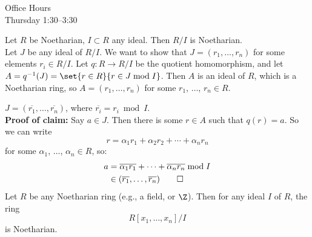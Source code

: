 Office Hours \\
Thursday 1:30--3:30

\thm Let $R$ be Noetharian, $I\subset R$ any ideal.  Then $R/I$ is Noetharian. \\
\pf Let $J$ be any ideal of $R/I$.  We want to show that $J=(r_1,\dotsc,r_n)$ for some elements $r_i\in R/I$.  Let $q\colon R\to R/I$ be the quotient homomorphism, and let $A=q^{-1}(J)=\set{r\in R}{r\in J\bmod I}$.  Then $A$ is an ideal of $R$, which is a Noetharian ring, so $A=(r_1,\dotsc,r_n)$ for some $r_1$, $\dotsc$, $r_n\in R$.

\claim $J=(\overline{r_1},\dotsc,\overline{r_n})$, where $\overline{r_i}=r_i\bmod I$. \\
\textbf{Proof of claim:} Say $a\in J$.  Then there is some $r\in A$ such that $q(r)=a$.  So we can write
\[ r = \alpha_1 r_1 + \alpha_2 r_2 + \dotsb + \alpha_n r_n \]
for some $\alpha_1$, $\dotsc$, $\alpha_n\in R$, so:
\begin{align*}
a &= \overline{\alpha_1}\overline{r_1} + \dotsb + \overline{\alpha_n}\overline{r_n} \bmod I \\
&\in (\overline{r_1},\dotsc,\overline{r_n}) \qed
\end{align*}
\cor Let $R$ be any Noetharian ring (e.g., a field, or $\Z$).  Then for any ideal $I$ of $R$, the ring
\[ R[x_1,\dotsc,x_n]/I \]
is Noetharian.

